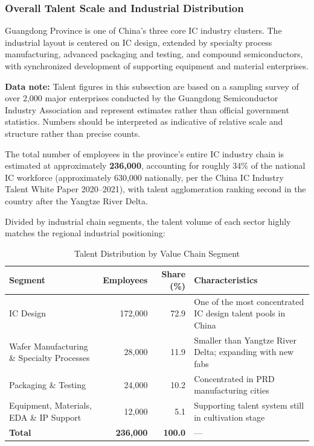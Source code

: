 \documentclass[12pt,a4paper]{article}
\newcommand{\tableHeaderRow}{\rowcolor{tealPrimary}\color{white}}
\newcommand{\tableOddRow}{\rowcolor{mintBG}}
\newcommand{\tableEvenRow}{\rowcolor{white}}
\begin{document}
\subsubsection{Overall Talent Scale and Industrial Distribution}

Guangdong Province is one of China's three core IC industry clusters. The
industrial layout is centered on IC design, extended by specialty process
manufacturing, advanced packaging and testing, and compound semiconductors,
with synchronized development of supporting equipment and material enterprises.

{\footnotesize\textbf{Data note:} Talent figures in this subsection are based
on a sampling survey of over 2,000 major enterprises conducted by the Guangdong
Semiconductor Industry Association and represent estimates rather than official
government statistics. Numbers should be interpreted as indicative of relative
scale and structure rather than precise counts.}

The total number of employees in the province's entire IC industry chain is
estimated at approximately \textbf{236,000}, accounting for roughly 34\% of the
national IC workforce (approximately 630,000 nationally, per the China IC
Industry Talent White Paper 2020--2021), with talent agglomeration ranking
second in the country after the Yangtze River Delta.

Divided by industrial chain segments, the talent volume of each sector highly
matches the regional industrial positioning:

\begin{table}[H]
\centering
\caption{Talent Distribution by Value Chain Segment}
\label{tab:talent_segment}
\begin{tabular}{p{3.8cm}rrp{6.8cm}}
\toprule
\tableHeaderRow
\textbf{Segment} & \textbf{Employees} & \textbf{Share (\%)} & \textbf{Characteristics} \\
\midrule
\tableOddRow  IC Design & 172,000 & 72.9 & One of the most concentrated IC design talent pools in China \\
\tableEvenRow Wafer Manufacturing \& Specialty Processes & 28,000 & 11.9 & Smaller than Yangtze River Delta; expanding with new fabs \\
\tableOddRow  Packaging \& Testing & 24,000 & 10.2 & Concentrated in PRD manufacturing cities \\
\tableEvenRow Equipment, Materials, EDA \& IP Support & 12,000 & 5.1 & Supporting talent system still in cultivation stage \\
\midrule
\tableOddRow  \textbf{Total} & \textbf{236,000} & \textbf{100.0} & --- \\
\bottomrule
\end{tabular}
\end{table}
\end{document}
